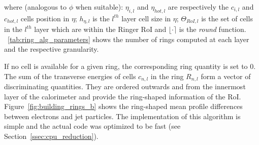 \noindent where (analogous to $\phi$ when suitable): $\eta_{i,l}$
and $\eta_{hot,l}$ are respectively the $c_{i,l}$ and $c_{hot,l}$
cells position in $\eta$; $h_{\eta,l}$ is the $l^{th}$ layer cell size in $\eta$; $\Theta_{RoI,l}$ is the set of cells
in the $l^{th}$ layer which are within the Ringer RoI and $\lfloor \cdot \rceil$ is the \textit{round} function.
\tablename~\ref{tab:ring_alg_parameters} shows the number of rings computed at each layer and the respective granularity.





If no cell is available for a given ring, the corresponding ring quantity is set to 0.
The sum of the transverse energies of cells $c_{n,l}$ in the ring $R_{n,l}$ form a vector of discriminating quantities. 
They are ordered outwards and from the
innermost layer of the calorimeter and provide the ring-shaped information 
of the RoI. Figure~\ref{fig:building_rings_b} shows the ring-shaped mean profile differences between electrons and jet particles. The implementation of this algorithm is simple and the actual code
was optimized to be fast (see Section~\ref{ssec:cpu_reduction}). 









%


